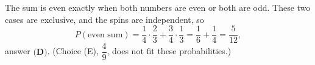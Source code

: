 The sum is even exactly when both numbers are even or both are odd. These two cases are exclusive, and the spins are independent, so
\[
P(\text{even sum})=\dfrac{1}{4}\cdot\dfrac{2}{3}+\dfrac{3}{4}\cdot\dfrac{1}{3}=\dfrac{1}{6}+\dfrac{1}{4}=\dfrac{5}{12},
\]
answer $\boxed{\textbf{(D)}}$. (Choice (E), $\dfrac{4}{9}$, does not fit these probabilities.)
